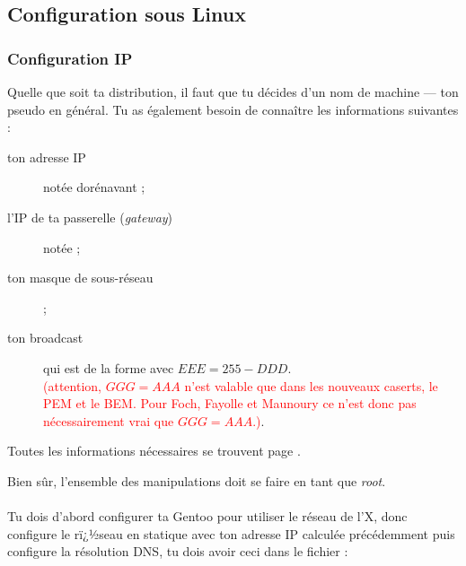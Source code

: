 


\subsection{Configuration sous Linux}

\subsubsection{Configuration IP}
Quelle que soit ta distribution, il faut que tu d\'ecides d'un nom de
machine --- ton pseudo en g\'en\'eral. Tu as \'egalement besoin de
conna\^itre les informations suivantes :
\begin{description}
  \item [ton adresse IP] not\'ee dor\'enavant  ;
  \item [l'IP de ta passerelle (\emph{gateway})] not\'ee  ;
  \item [ton masque de sous-r\'eseau]  ;
  \item [ton broadcast] qui est de la forme  avec $EEE = 255 - DDD$. \\
        \textcolor{red}{(attention, $GGG = AAA$ n'est valable que dans les nouveaux caserts, le PEM et le BEM. Pour Foch, Fayolle et Maunoury ce n'est donc pas n\'ecessairement vrai que $GGG =
        AAA$.)}.
\end{description}

Toutes les informations n\'ecessaires se trouvent page
\pageref{calcul_ip}.

Bien s\^ur, l'ensemble des manipulations doit se faire en tant que \emph{root}.


\paragraph{}

Tu dois d'abord configurer ta Gentoo pour utiliser le r\'eseau de l'X, donc configure le rï¿½seau en statique avec ton adresse IP calcul\'ee pr\'ec\'edemment puis
configure la r\'esolution DNS, tu dois avoir ceci dans le fichier  :

